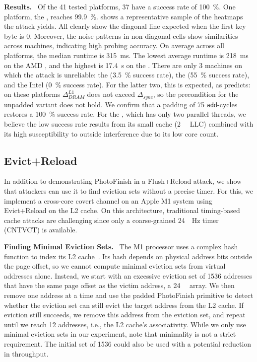 \documentclass[letterpaper,twocolumn,10pt]{article} %
\newcommand{\paragrabf}[1]{\noindent \textbf{#1.}\ }
\newcommand{\AttackName}{PhotoFinish\xspace}
\newcommand{\rdelta}[1]{$\Delta_{#1}$}
\begin{document}
\paragrabf{Results}
Of the \num{41} tested platforms, \num{37} have a success rate of \SI{100}{\percent}.
One platform, the \labnineCPU, reaches \SI{99.9}{\percent}.
 shows a representative sample of the heatmaps the attack yields.
All clearly show the diagonal line expected when the first key byte is 0.
Moreover, the noise patterns in non-diagonal cells show similarities across machines, indicating high probing accuracy.
On average across all platforms, the median runtime is \SI{315}{\milli\second}.
The lowest average runtime is \SI{218}{\milli\second} on the AMD \labeightyCPU, and the highest is \SI{17.4}{\second} on the \labfourtyeightCPU.
There are only \num{3} machines on which the attack is unreliable: the \labthirtytwoCPU (\SI{3.5}{\percent} success rate), the \labeightythreeCPU (\SI{55}{\percent} success rate), and the Intel \labfourtyfourCPU (\SI{0}{\percent} success rate).
For the latter two, this is expected, as  predicts: on these platforms $\Delta^{L1}_{DRAM}$ does not exceed \rdelta{sync}, so the precondition for the unpadded variant does not hold.
We confirm that a padding of \num{75} \texttt{add}-cycles restores a \SI{100}{\percent} success rate.
For the \labthirtytwoCPU, which has only two parallel threads, we believe the low success rate results from its small cache (\SI{2}{\mega\byte} LLC) combined with its high susceptibility to outside interference due to its low core count.

\subsection{Evict+Reload}\label{subsec:timerless-evict-reload}

In addition to demonstrating \AttackName in a Flush+Reload attack, we show that attackers can use it to find eviction sets without a precise timer.
For this, we implement a cross-core covert channel on an Apple M1 system using Evict+Reload on the L2 cache.
On this architecture, traditional timing-based cache attacks are challenging since only a coarse-grained \SI{24}{\mega{}Hz} timer (CNTVCT) is available.

\paragrabf{Finding Minimal Eviction Sets}
The M1 processor uses a complex hash function to index its L2 cache~\cite{Yu2023Synchronization}.
Its hash depends on physical address bits outside the page offset, so we cannot compute minimal eviction sets from virtual addresses alone.
Instead, we start with an excessive eviction set of \num{1536} addresses that have the same page offset as the victim address, \ie a \SI{24}{\mega\byte} array.
We then remove one address at a time and use the padded \AttackName primitive to detect whether the eviction set can still evict the target address from the L2 cache.
If eviction still succeeds, we remove this address from the eviction set, and repeat until we reach \num{12} addresses, i.e., the L2 cache's associativity.
While we only use minimal eviction sets in our experiment, note that minimality is not a strict requirement.
The initial set of \num{1536} could also be used with a potential reduction in throughput.
\end{document}
